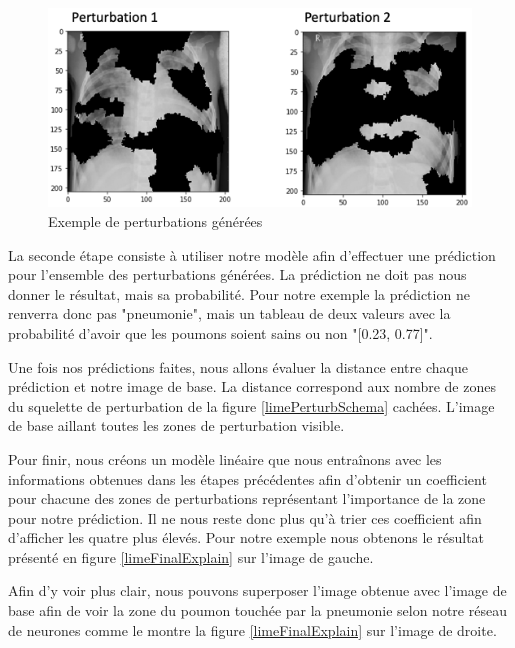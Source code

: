 \begin{figure}[h]
    \includegraphics[scale=0.7]{src_img/limePerturbations.png}
    \caption{Exemple de perturbations générées}
    \label{limePerturbExemple}
\end{figure}

La seconde étape consiste à utiliser notre modèle afin d'effectuer une prédiction pour l'ensemble des perturbations générées. La prédiction ne doit pas nous donner le résultat, mais sa probabilité. Pour notre exemple la prédiction ne renverra donc pas "pneumonie", mais un tableau de deux valeurs avec la probabilité d'avoir que les poumons soient sains ou non "[0.23, 0.77]".\par
Une fois nos prédictions faites, nous allons évaluer la distance entre chaque prédiction et notre image de base. La distance correspond aux nombre de zones du squelette de perturbation de la figure \ref{limePerturbSchema} cachées. L'image de base aillant toutes les zones de perturbation visible.\par
Pour finir, nous créons un modèle linéaire que nous entraînons avec les informations obtenues dans les étapes précédentes afin d'obtenir un coefficient pour chacune des zones de perturbations représentant l'importance de la zone pour notre prédiction. Il ne nous reste donc plus qu'à trier ces coefficient afin d'afficher les quatre plus élevés. Pour notre exemple nous obtenons le résultat présenté en figure \ref{limeFinalExplain} sur l'image de gauche.

Afin d'y voir plus clair, nous pouvons superposer l'image obtenue avec l'image de base afin de voir la zone du poumon touchée par la pneumonie selon notre réseau de neurones comme le montre la figure \ref{limeFinalExplain} sur l'image de droite.

